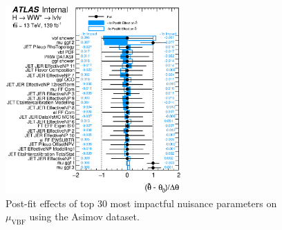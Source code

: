 
\begin{figure}[!h]
\centering
      \includegraphics[width=0.6\textwidth]{Pictures/fitresults/impact_asimov_mu_vbf.eps}
\caption{Post-fit effects of top 30 most impactful nuisance parameters on $\mu_{\text{VBF}}$ using the Asimov dataset.}
\label{fig:impactsasimov}
\end{figure}

